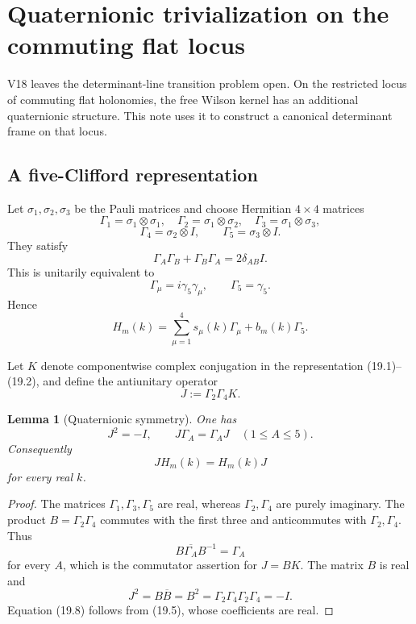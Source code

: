 \documentclass[11pt]{article}
\newtheorem{lemma}[theorem]{Lemma}
\begin{document}
\section{Quaternionic trivialization on the commuting flat locus}
\label{sec:v11v19}

V18 leaves the determinant-line transition problem open.  On the restricted
locus of commuting flat holonomies, the free Wilson kernel has an
additional quaternionic structure.  This note uses it to construct a
canonical determinant frame on that locus.

\subsection{A five-Clifford representation}

Let \(\sigma_1,\sigma_2,\sigma_3\) be the Pauli matrices and choose
Hermitian \(4\times4\) matrices
\[
 \Gamma_1=\sigma_1\otimes\sigma_1,\quad
 \Gamma_2=\sigma_1\otimes\sigma_2,\quad
 \Gamma_3=\sigma_1\otimes\sigma_3,
 \tag{19.1}
\]
\[
 \Gamma_4=\sigma_2\otimes I,\qquad
 \Gamma_5=\sigma_3\otimes I.
 \tag{19.2}
\]
They satisfy
\[
 \Gamma_A\Gamma_B+\Gamma_B\Gamma_A=2\delta_{AB}I.
 \tag{19.3}
\]
This is unitarily equivalent to
\[
 \Gamma_\mu=i\gamma_5\gamma_\mu,\qquad
 \Gamma_5=\gamma_5.
 \tag{19.4}
\]
Hence
\[
 H_m(k)=\sum_{\mu=1}^4s_\mu(k)\Gamma_\mu+b_m(k)\Gamma_5.
 \tag{19.5}
\]

Let \(K\) denote componentwise complex conjugation in the representation
(19.1)--(19.2), and define the antiunitary operator
\[
 J:=\Gamma_2\Gamma_4K.
 \tag{19.6}
\]

\begin{lemma}[Quaternionic symmetry]
\label{lem:v11v19-quaternionic}
One has
\[
 J^2=-I,\qquad
 J\Gamma_A=\Gamma_AJ
 \quad(1\leq A\leq5).
 \tag{19.7}
\]
Consequently
\[
 JH_m(k)=H_m(k)J
 \tag{19.8}
\]
for every real \(k\).
\end{lemma}

\begin{proof}
The matrices \(\Gamma_1,\Gamma_3,\Gamma_5\) are real, whereas
\(\Gamma_2,\Gamma_4\) are purely imaginary.  The product
\(B=\Gamma_2\Gamma_4\) commutes with the first three and anticommutes
with \(\Gamma_2,\Gamma_4\).  Thus
\[
 B\overline{\Gamma_A}B^{-1}=\Gamma_A
\]
for every \(A\), which is the commutator assertion for \(J=BK\).
The matrix \(B\) is real and
\[
 J^2=B\overline B=B^2
 =\Gamma_2\Gamma_4\Gamma_2\Gamma_4=-I.
\]
Equation (19.8) follows from (19.5), whose coefficients are real.
\end{proof}
\end{document}
